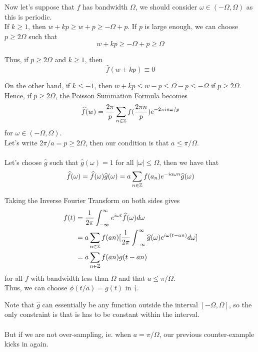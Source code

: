 \documentclass{article}
\begin{document}
Now let's suppose that $f$ has bandwidth $\Omega$, we should consider $\omega \in (-\Omega, \Omega)$ as this is periodic.\\

If $k \geq 1$, then $w + kp \geq w + p \geq -\Omega + p$. If $p$ is large enough, we can choose $p \geq 2\Omega$ such that
\[w + kp \geq -\Omega + p \geq \Omega\]

Thus, if $p \geq 2 \Omega$ and $k \geq 1$, then
\[\widehat{f}(w + kp) \equiv 0\]

On the other hand, if $k \leq -1$, then $w + kp \leq w - p \leq \Omega - p \leq -\Omega$ if $p \geq 2 \Omega$.\\

Hence, if $p \geq 2\Omega$, the Poisson Summation Formula becomes
\[\widehat{f}(w) = \frac{2\pi}{p} \sum_{n \in \mathbb{Z}} f(\frac{2\pi n}{p}) e^{-2\pi i n \omega/p}\]
for $\omega \in (-\Omega, \Omega)$.\\

Let's write $2\pi/a = p \geq 2\Omega$, then our condition is that $a \leq \pi/\Omega$.\\\\

Let's choose $\widehat{g}$ such that $\widehat{g}(\omega) = 1$ for all $|\omega| \leq \Omega$, then we have that
\[\widehat{f}(\omega) = \widehat{f}(\omega) \widehat{g}(\omega) = a \sum_{n \in \mathbb{Z}} f(a_n) e^{-i a \omega n} \widehat{g}(\omega)\]

Taking the Inverse Fourier Transform on both sides gives
\begin{align*}
    f(t) &= \frac{1}{2\pi} \int_{-\infty}^\infty e^{i\omega t} \widehat{f}(\omega) d\omega \\
    &= a \sum_{n \in \mathbb{Z}} f(an) [\frac{1}{2\pi} \int_{-\infty}^\infty \widehat{g}(\omega) e^{i \omega (t - an)} d\omega]\\
    &= a \sum_{n \in \mathbb{Z}} f(an) g(t - an)
\end{align*}
for all $f$ with bandwidth less than $\Omega$ and that $a \leq \pi/\Omega$.\\

Thus, we can choose $\phi(t/a) = g(t)$ in $\dagger$.

\begin{remark}
    Note that $\widehat{g}$ can essentially be any function outside the interval $[-\Omega, \Omega]$, so the only constraint is that is has to be constant within the interval.\\\\
    But if we are not over-sampling, ie. when $a = \pi/\Omega$, our previous counter-example kicks in again.
\end{remark}
\end{document}
